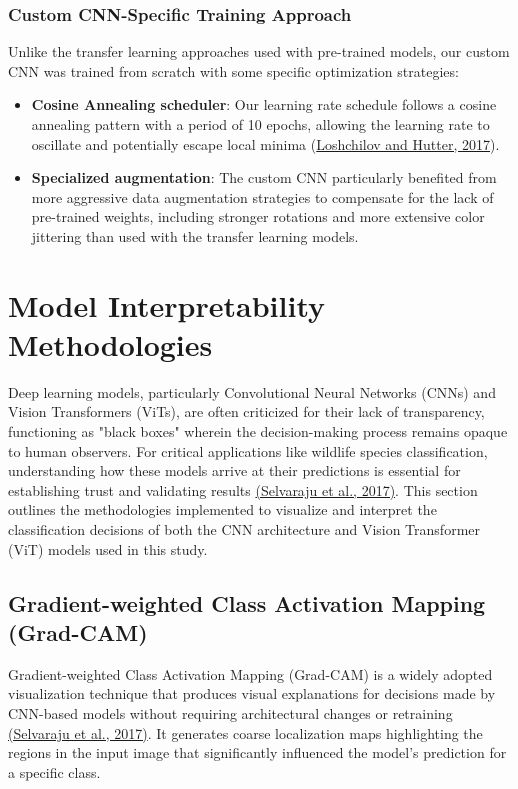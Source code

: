\documentclass[a4paper,12pt]{report}
\begin{document}
\subsubsection{Custom CNN-Specific Training Approach}

Unlike the transfer learning approaches used with pre-trained models, our custom CNN was trained from scratch with some specific optimization strategies:

\begin{itemize}
    \item \textbf{Cosine Annealing scheduler}: Our learning rate schedule follows a cosine annealing pattern with a period of 10 epochs, allowing the learning rate to oscillate and potentially escape local minima (\href{https://arxiv.org/abs/1608.03983}{Loshchilov and Hutter, 2017}).
    
    \item \textbf{Specialized augmentation}: The custom CNN particularly benefited from more aggressive data augmentation strategies to compensate for the lack of pre-trained weights, including stronger rotations and more extensive color jittering than used with the transfer learning models.
\end{itemize}

\section{Model Interpretability Methodologies}

Deep learning models, particularly Convolutional Neural Networks (CNNs) and Vision Transformers (ViTs), are often criticized for their lack of transparency, functioning as "black boxes" wherein the decision-making process remains opaque to human observers. For critical applications like wildlife species classification, understanding how these models arrive at their predictions is essential for establishing trust and validating results \href{https://arxiv.org/abs/1610.02391}{(Selvaraju et al., 2017)}. This section outlines the methodologies implemented to visualize and interpret the classification decisions of both the CNN architecture and Vision Transformer (ViT) models used in this study.

\subsection{Gradient-weighted Class Activation Mapping (Grad-CAM)}

Gradient-weighted Class Activation Mapping (Grad-CAM) is a widely adopted visualization technique that produces visual explanations for decisions made by CNN-based models without requiring architectural changes or retraining \href{https://arxiv.org/abs/1610.02391}{(Selvaraju et al., 2017)}. It generates coarse localization maps highlighting the regions in the input image that significantly influenced the model's prediction for a specific class.
\end{document}
